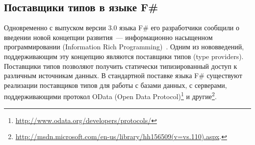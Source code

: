 \subsection{Поставщики типов в языке F\#}\label{f-sharp-type-providers}
Одновременно с выпуском версии 3.0 языка F\# его разработчики сообщили о введении новой концепции развития~--- информационно насыщенном программировании (Information Rich Programming)~\cite{joepamer2011}.
Одним из нововведений, поддерживающим эту концепцию являются поставщики типов (type providers).
Поставщики типов позволяют получить статически типизированный доступ к различным источникам данных.
В стандартной поставке языка F\# существуют реализации поставщиков типов для работы с базами данных, с серверами, поддерживающими протокол OData (Open Data Protocol)\footnote{\url{http://www.odata.org/developers/protocols/}} и другие\footnote{\url{http://msdn.microsoft.com/en-us/library/hh156509(v=vs.110).aspx}.}.

